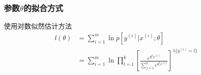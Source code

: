 \subsubsection{参数$\theta$的拟合方式}
使用对数似然估计方法
\begin{align}
	l(\theta) &= \sum_{i=1}^{m}\ln p\left[y^{(i)}|x^{(i)};\theta\right] \\
	&= \sum_{i=1}^{m} \ln \prod_{l=1}^{k}\left[
	\frac{e^{\theta_l^Tx^{(i)}}}{\sum_{j=1}^{k}e^{\theta_l^Tx^{(i)}}}
	\right]^{1\{y^{(i)}=l\}}
\end{align}
{\color{red}{需后续待补充}}











